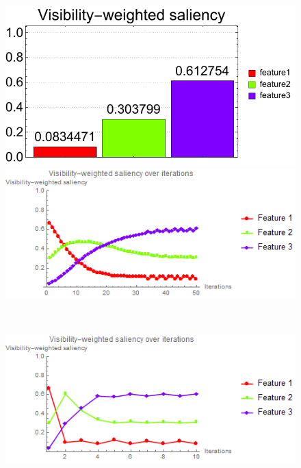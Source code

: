 \begin{figure}
\begin{minipage}{.25\textwidth}
		\subcaption{}
	\end{minipage}~
	\begin{minipage}{.25\textwidth}
		\includegraphics[width=1\linewidth]{figures/CT-Knee_naive_optimized_linesearch_visibility_saliency_weighted_chart}
		\subcaption{}
	\end{minipage}	
	
	\begin{minipage}{.49\textwidth}
		\includegraphics[width=1\linewidth]{images/CT-Knee_naive_saliency_fixed}
		\subcaption{}
	\end{minipage}~
	\begin{minipage}{.49\textwidth}
		\includegraphics[width=1\linewidth]{images/CT-Knee_naive_saliency_parallelsearch}
		\subcaption{}
	\end{minipage}
	

\end{figure}
